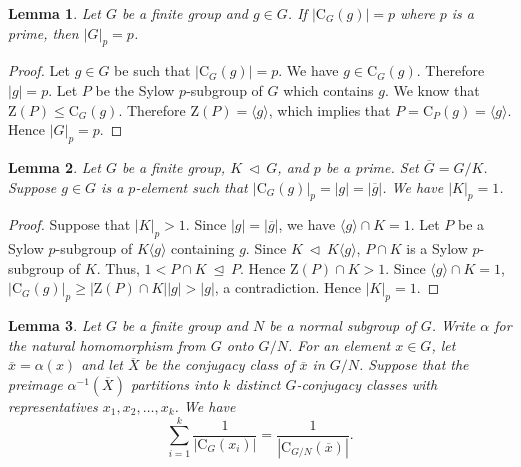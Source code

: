 \documentclass[11pt]{article}
\providecommand{\C}{{\mathrm{C}}}
\providecommand{\Z}{{\mathrm{Z}}}
\providecommand{\teq}{{\ \trianglelefteq \ }}
\providecommand{\te}{{\ \triangleleft \ }}
\providecommand{\gen}[1]{\langle #1 \rangle} %
\providecommand{\gen}[1]{\langle #1 \rangle} %
\providecommand{\gen}[1]{\langle #1 \rangle} %
\providecommand{\olg}{{\overline{g}}}
\providecommand{\olG}{{\overline{G}}}
\newtheorem{lem}{Lemma}
\begin{document}

\begin{lem}
\label{Sylp}
Let $G$ be a finite group and $g\in G$.
If $|\C_G(g)|=p$ where $p$ is a prime, then $|G|_p=p$.
\end{lem}

\begin{proof}
Let $g\in G$ be such that $|\C_G(g)|=p$. 
We have $g\in \C_G(g)$. 
Therefore $|g|=p$. 
Let $P$ be the Sylow $p$-subgroup of $G$ which contains $g$.
We know that $\Z(P)\leq \C_G(g)$.
Therefore $\Z(P)=\gen{g}$, which implies that $P=\C_P(g)=\gen{g}$.
Hence $|G|_p=p$.
\end{proof}

\begin{lem}
\label{trivial}
    Let $G$ be a finite group, $K \te G$, and $p$ be a prime. 
    Set $\olG=G/K$.
    Suppose $g \in G$ is a $p$-element such that $|\C_G(g)|_p = |g| = |\olg|$. 
    We have $|K|_p = 1$.
\end{lem}

\begin{proof}
    Suppose that $|K|_p > 1$.
    Since $|g|=|\olg|$, we have $\gen{g}\cap K=1$.
    Let $P$ be a Sylow $p$-subgroup of $K\gen{g}$ containing $g$.
    Since $K \te K\gen{g}$, $P\cap K$ is a Sylow $p$-subgroup of $K$. 
    Thus, $1 < P\cap K \teq P$.
    Hence $\Z(P)\cap K > 1$.
    Since $\gen{g}\cap K=1$,  $|\C_G(g)|_p \geq |\Z(P)\cap K||g|>|g|$, a contradiction.
    Hence $|K|_p=1$.
\end{proof}

\begin{lem}
\label{Orbit}
    Let $G$ be a finite group and $N$ be a normal subgroup of $G$. 
    Write $\alpha$ for the natural homomorphism from $G$ onto $G/N$. 
    For an element $x \in G$, let $\overline{x} = \alpha(x)$ and let $\overline{X}$ be the conjugacy class of $\overline{x}$ in $G/N$.
    Suppose that the preimage $\alpha^{-1}(\overline{X})$ partitions into $k$ distinct $G$-conjugacy classes 
    with representatives $x_1, x_2, \dots, x_k$. We have
$$
\sum_{i=1}^{k} \dfrac{1}{|\C_G(x_i)|} = \dfrac{1}{|\C_{G/N}(\overline{x})|}.
$$
\end{lem}
\end{document}
